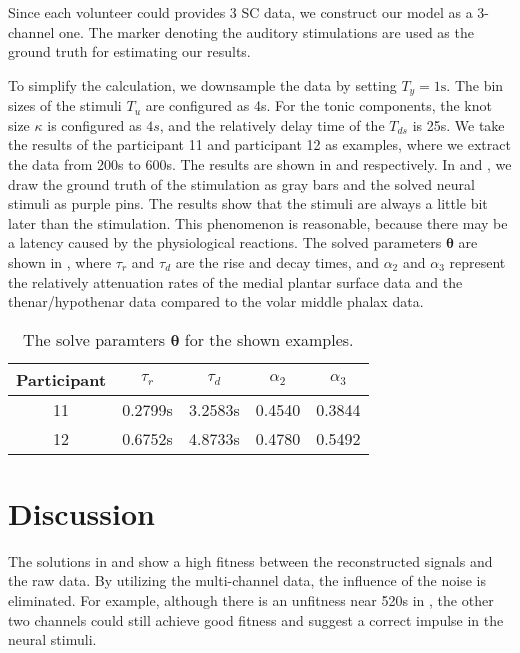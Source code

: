 \documentclass[10pt,conference]{ieeeconf}
\providecommand{\rm}[1]{\mathrm{#1}}
\begin{document}
Since each volunteer could provides 3 SC data, we construct our model as a 3-channel one. The marker denoting the auditory stimulations are used as the ground truth for estimating our results.

To simplify the calculation, we downsample the data by setting $T_y=1\rm{s}$. The bin sizes of the stimuli $T_u$ are configured as 4s. For the tonic components, the knot size $\kappa$ is configured as $4s$, and the relatively delay time of the $T_{ds}$ is 25s. We take the results of the participant 11 and participant 12 as examples, where we extract the data from 200s to 600s. The results are shown in  and  respectively. In  and , we draw the ground truth of the stimulation as gray bars and the solved neural stimuli as purple pins. The results show that the stimuli are always a little bit later than the stimulation. This phenomenon is reasonable, because there may be a latency caused by the physiological reactions. The solved parameters $\boldsymbol{\theta}$ are shown in , where $\tau_r$ and $\tau_d$ are the rise and decay times, and $\alpha_2$ and $\alpha_3$ represent the relatively attenuation rates of the medial plantar surface data and the thenar/hypothenar data compared to the volar middle phalax data.

\begin{table}[h] 
  \centering
  \caption{The solve paramters $\boldsymbol{\theta}$ for the shown examples.} \label{tab:theta}
  \begin{tabular}{|c|c|c|c|c|}
    \hline
    Participant & $\tau_r$ & $\tau_d$ & $\alpha_{2}$ & $\alpha_{3}$ \\
    \hline
    11 & 0.2799s & 3.2583s & 0.4540 & 0.3844\\ \hline
    12 & 0.6752s & 4.8733s & 0.4780 & 0.5492\\
    \hline
  \end{tabular}
\end{table}

\section{Discussion}

The solutions in  and  show a high fitness between the reconstructed signals and the raw data. By utilizing the multi-channel data, the influence of the noise is eliminated. For example, although there is an unfitness near 520s in , the other two channels could still achieve good fitness and suggest a correct impulse in the neural stimuli.
\end{document}
